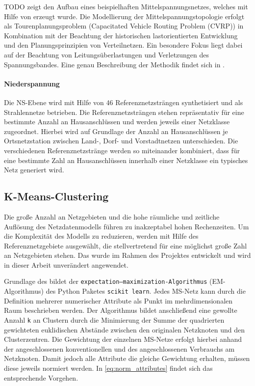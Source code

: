 
{\color{red} TODO} zeigt den Aufbau eines beispielhaften Mittelspannungsnetzes, welches mit Hilfe von \dingo erzeugt wurde.
Die Modellierung der Mittelspannungstopologie erfolgt als Tourenplanungsproblem (Capacitated Vehicle Routing
Problem (CVRP)) in Kombination mit der Beachtung der historischen lastorientierten Entwicklung und den Planungsprinzipien von Verteilnetzen.
Ein besondere Fokus liegt dabei auf der Beachtung von Leitungsüberlastungen und Verletzungen des Spannungsbandes.
Eine genau Beschreibung der Methodik findet sich in \cite{Amme2018}.


\paragraph{Niederspannung}

Die \gls{NS}-Ebene wird mit Hilfe von \num{46} Referenznetzsträngen synthetisiert und als Strahlennetze betrieben.
Die Referenznetzsträngen stehen repräsentativ für eine bestimmte Anzahl an Hausanschlüssen und werden jeweils einer Netzklasse zugeordnet.
Hierbei wird auf Grundlage der Anzahl an Hausanschlüssen je Ortsnetzstation zwischen Land-, Dorf- und Vorstadtnetzen unterschieden.
Die verschiedenen Referenznetzstränge werden so miteinander kombiniert, dass für eine bestimmte Zahl an Hausanschlüssen innerhalb einer Netzklasse ein typisches Netz generiert wird. \cite{Mueller2019}


\subsection{K-Means-Clustering}

Die große Anzahl an Netzgebieten und die hohe räumliche und zeitliche Auflösung des Netzdatenmodells führen zu inakzeptabel hohen Rechenzeiten.
Um die Komplexität des Modells zu reduzieren, werden mit Hilfe des \kmeans Referenznetzgebiete ausgewählt, die stellvertretend für eine möglichst große Zahl an Netzgebieten stehen.
Das \kmeans wurde im Rahmen des \openego Projektes entwickelt und wird in dieser Arbeit unverändert angewendet. \cite{Mueller2019}\medskip

Grundlage des \kmeans bildet der \texttt{expectation–maximization-Algorithmus} (EM-Algorithmus) des Python Paketes \texttt{scikit learn}. \cite{scikit-learn2011}
Jedes \gls{MS}-Netz kann durch die Definition mehrerer numerischer Attribute als Punkt im mehrdimensionalen Raum beschrieben werden.
Der Algorithmus bildet anschließend eine gewollte Anzahl \texttt{k} an Clustern durch die Minimierung der Summe der quadrierten gewichteten euklidischen Abstände zwischen den originalen Netzknoten und den Clusterzentren.
Die Gewichtung der einzelnen \gls{MS}-Netze erfolgt hierbei anhand der angeschlossenen konventionellen und des angeschlossenen Verbrauchs am Netzknoten.
Damit jedoch alle Attribute die gleiche Gewichtung erhalten, müssen diese jeweils normiert werden.
In \autoref{eq:norm_attributes} findet sich das entsprechende Vorgehen.

